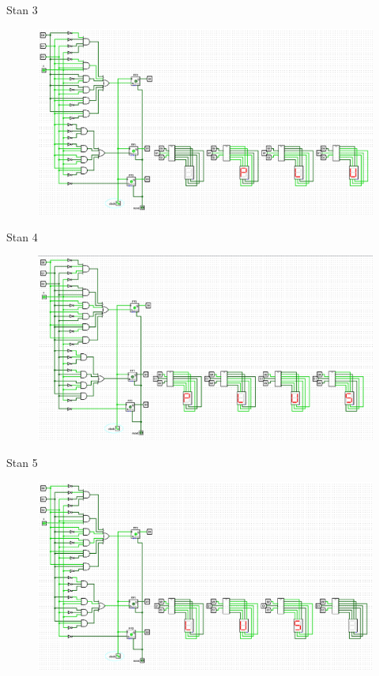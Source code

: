 \documentclass[]{article}
\begin{document}
\newpage
Stan 3
\begin{figure}[H]
	\centering
	\includegraphics[width=1.2\textwidth]{3.png}
\end{figure}
\newpage
Stan 4
\begin{figure}[H]
	\centering
	\includegraphics[width=1.2\textwidth]{4.png}
\end{figure}
\newpage
Stan 5
\begin{figure}[H]
	\centering
	\includegraphics[width=1.2\textwidth]{5.png}
\end{figure}
\end{document}
